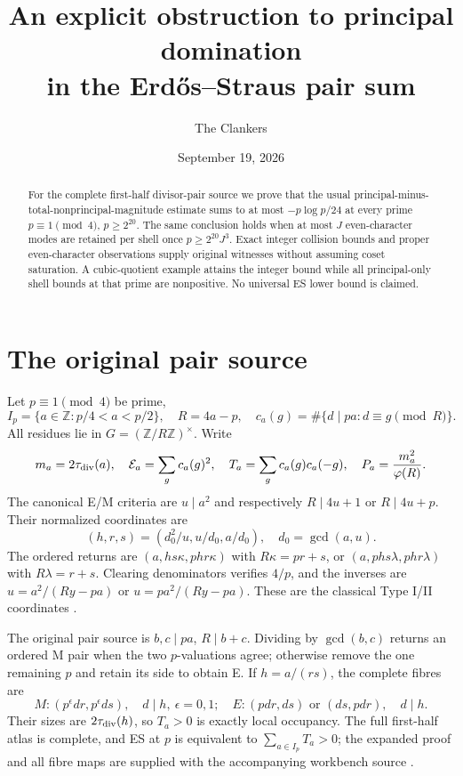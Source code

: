 \documentclass[10pt,reqno]{amsart}
\title[Complete-shell collision bounds]{An explicit obstruction to principal domination\\in the Erd\H{o}s--Straus pair sum}
\author{The Clankers}
\date{September 19, 2026}
\begin{document}
\begin{abstract}
For the complete first-half divisor-pair source we prove that the usual
principal-minus-total-nonprincipal-magnitude estimate sums to at most
$-p\log p/24$ at every prime $p\equiv1\pmod4$, $p\ge2^{20}$. The same conclusion
holds when at most $J$ even-character modes are retained per shell once
$p\ge2^{20}J^3$. Exact integer collision bounds and proper even-character observations supply
original witnesses without assuming coset saturation.
A cubic-quotient example attains the integer bound while all principal-only
shell bounds at that prime are nonpositive. No universal ES lower bound is claimed.
\end{abstract}
\maketitle

\section{The original pair source}
Let $p\equiv1\pmod4$ be prime,
\[
 I_p=\{a\in\mathbb Z:p/4<a<p/2\},\quad R=4a-p,\quad
 c_a(g)=\#\{d\mid pa:d\equiv g\pmod R\}.
\]
All residues lie in $G=(\mathbb Z/R\mathbb Z)^\times$. Write
\[
 m_a=2\tau_{\rm div}(a),\quad \mathcal E_a=\sum_gc_a(g)^2,\quad
 T_a=\sum_gc_a(g)c_a(-g),\quad P_a=\frac{m_a^2}{\varphi(R)}.
\]
The canonical E/M criteria are $u\mid a^2$ and respectively $R\mid4u+1$ or
$R\mid4u+p$. Their normalized coordinates are
\[
 (h,r,s)=(d_0^2/u,u/d_0,a/d_0),\quad d_0=\gcd(a,u).
\]
The ordered returns are $(a,hs\kappa,phr\kappa)$ with
$R\kappa=pr+s$, or $(a,phs\lambda,phr\lambda)$ with $R\lambda=r+s$.
Clearing denominators verifies $4/p$, and the inverses are
$u=a^2/(Ry-pa)$ or $u=pa^2/(Ry-pa)$. These are the classical Type I/II
coordinates \cite[\S2]{ET}.

The original pair source is $b,c\mid pa$, $R\mid b+c$. Dividing by
$\gcd(b,c)$ returns an ordered M pair when the two $p$-valuations agree;
otherwise remove the one remaining $p$ and retain its side to obtain E.
If $h=a/(rs)$, the complete fibres are
\[
 M:(p^\epsilon dr,p^\epsilon ds),\quad d\mid h,\ \epsilon=0,1;
\quad
 E:(pdr,ds)\text{ or }(ds,pdr),\quad d\mid h.
\]
Their sizes are $2\tau_{\rm div}(h)$, so $T_a>0$ is exactly local occupancy.
The full first-half atlas is complete, and ES at $p$ is equivalent to
$\sum_{a\in I_p}T_a>0$; the expanded proof and all fibre maps are supplied
with the accompanying workbench source \cite{Workbench}.
\end{document}
